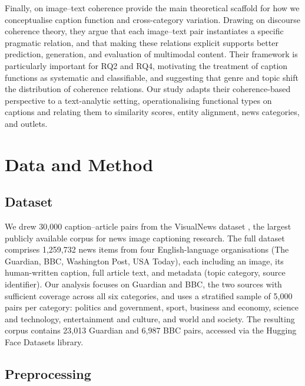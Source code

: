 \documentclass[11pt,a4paper]{article}
\begin{document}
Finally, \citet{Alikhani2023ImageTextCoherence} on image--text coherence
provide the main theoretical scaffold for how we conceptualise caption
function and cross-category variation. Drawing on discourse coherence theory,
they argue that each image--text pair instantiates a specific pragmatic
relation, and that making these relations explicit supports better prediction,
generation, and evaluation of multimodal content. Their framework is
particularly important for RQ2 and RQ4, motivating the treatment of caption
functions as systematic and classifiable, and suggesting that genre and topic
shift the distribution of coherence relations. Our study adapts their
coherence-based perspective to a text-analytic setting, operationalising
functional types on captions and relating them to similarity scores, entity
alignment, news categories, and outlets.

\section{Data and Method}

\subsection{Dataset}

We drew 30,000 caption--article pairs from the VisualNews dataset
\citep{liu2021visualnews}, the largest publicly available corpus for news
image captioning research. The full dataset comprises 1,259,732 news items
from four English-language organisations (The Guardian, BBC, Washington Post,
USA Today), each including an image, its human-written caption, full article
text, and metadata (topic category, source identifier). Our analysis focuses
on Guardian and BBC, the two sources with sufficient coverage across all six
categories, and uses a stratified sample of 5,000 pairs per category:
politics and government, sport, business and economy, science and technology,
entertainment and culture, and world and society. The resulting corpus
contains 23,013 Guardian and 6,987 BBC pairs, accessed via the Hugging Face
Datasets library.

\subsection{Preprocessing}
\end{document}
